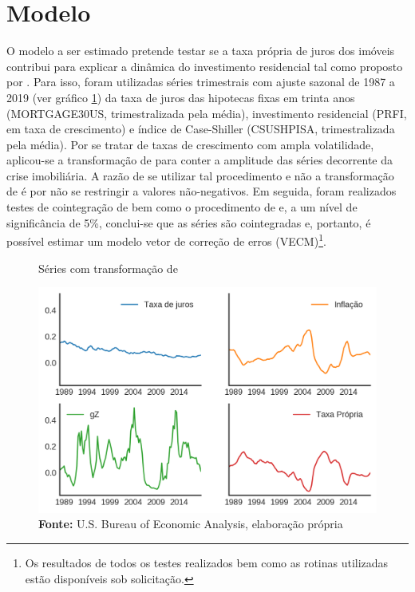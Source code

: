 \section{Modelo}
\label{Modelo_empirico}

O modelo a ser estimado pretende testar se a taxa própria de juros dos imóveis contribui para explicar a dinâmica do investimento residencial tal como proposto por \textcite{teixeira_crescimento_2015}. Para isso, foram utilizadas séries trimestrais com ajuste sazonal de 1987 a 2019 (ver gráfico \ref{YeoJhonson}) da taxa de juros das hipotecas fixas em trinta anos (MORTGAGE30US, trimestralizada pela média), investimento residencial (PRFI, em taxa de crescimento) e índice de Case-Shiller (CSUSHPISA, trimestralizada pela média).
Por se tratar de taxas de crescimento com ampla volatilidade, aplicou-se a transformação de \textcite{yeo_new_2000} para conter a amplitude das séries decorrente da crise imobiliária. A razão de se utilizar tal procedimento e não a transformação de \textcite{box_analysis_1964} é por não se restringir a valores não-negativos. Em seguida, foram realizados testes de cointegração de \textcite{engle_co-integration_1987} bem como o procedimento de \textcite{johansen_estimation_1991} e, a um nível de significância de 5\%, conclui-se que as séries são cointegradas e, portanto, é possível estimar um modelo vetor de correção de erros (VECM)\footnote{Os resultados de todos os testes realizados bem como as rotinas utilizadas estão disponíveis sob solicitação.}.


\begin{figure}[htb]
	\centering
	\caption{Séries com transformação de \textcite{yeo_new_2000}}
	\label{YeoJhonson}
	\includegraphics[width=\textwidth]{Fatos_Estilizados/Figs/YeoJohnson.png}
	\caption*{\textbf{Fonte:} U.S. Bureau of Economic Analysis, elaboração própria}
\end{figure}

